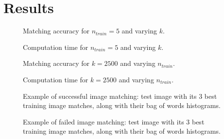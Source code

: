\documentclass[11pt,a4paper]{article}
\begin{document}
\section{Results}
%
\begin{figure}[H]
\centering
{}
\label{fig:results_k}
\caption{Matching accuracy for $n_{train} = 5$ and varying $k$.}
\end{figure}
%
\begin{figure}[H]
\centering
{}
\label{fig:results_k_time}
\caption{Computation time for $n_{train} = 5$ and varying $k$.}
\end{figure}
%
\begin{figure}[H]
\centering
{}
\label{fig:results_n_train}
\caption{Matching accuracy for $k = 2500$ and varying $n_{train}$.}
\end{figure}
%
\begin{figure}[H]
\centering
{}
\label{fig:results_n_train_time}
\caption{Computation time for $k = 2500$ and varying $n_{train}$.}
\end{figure}
%
\begin{figure}[H]
\centering
{}
\label{fig:results_11}
\caption{Example of successful image matching: test image with its 3 best training image matches, along with their bag of words histograms.}
\end{figure}
%
\begin{figure}[H]
\centering
{}
\label{fig:results_18}
\caption{Example of failed image matching: test image with its 3 best training image matches, along with their bag of words histograms.}
\end{figure}
%
\end{document}
